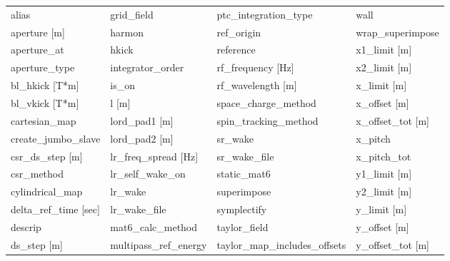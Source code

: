  \begin{tabular}{llll} \toprule
alias                            & grid_field                       & ptc_integration_type             & wall                             \\
aperture [m]                     & harmon                           & ref_origin                       & wrap_superimpose                 \\
aperture_at                      & hkick                            & reference                        & x1_limit [m]                     \\
aperture_type                    & integrator_order                 & rf_frequency [Hz]                & x2_limit [m]                     \\
bl_hkick [T*m]                   & is_on                            & rf_wavelength [m]                & x_limit [m]                      \\
bl_vkick [T*m]                   & l [m]                            & space_charge_method              & x_offset [m]                     \\
cartesian_map                    & lord_pad1 [m]                    & spin_tracking_method             & x_offset_tot [m]                 \\
create_jumbo_slave               & lord_pad2 [m]                    & sr_wake                          & x_pitch                          \\
csr_ds_step [m]                  & lr_freq_spread [Hz]              & sr_wake_file                     & x_pitch_tot                      \\
csr_method                       & lr_self_wake_on                  & static_mat6                      & y1_limit [m]                     \\
cylindrical_map                  & lr_wake                          & superimpose                      & y2_limit [m]                     \\
delta_ref_time [sec]             & lr_wake_file                     & symplectify                      & y_limit [m]                      \\
descrip                          & mat6_calc_method                 & taylor_field                     & y_offset [m]                     \\
ds_step [m]                      & multipass_ref_energy             & taylor_map_includes_offsets      & y_offset_tot [m]                 \\

\end{tabular}
